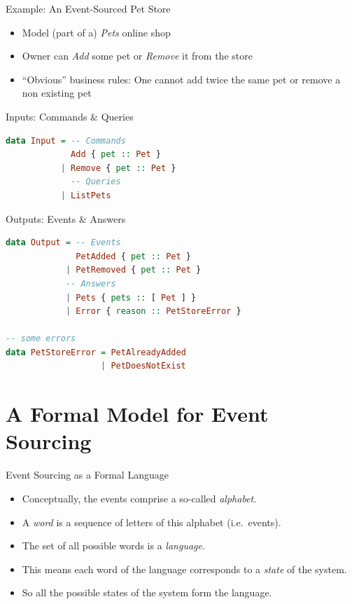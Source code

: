 \begin{frame}[fragile]{Example: An Event-Sourced Pet Store}
  \begin{itemize}[<+->]
  \item Model (part of a) \emph{Pets} online shop
  \item Owner can \emph{Add} some pet or \emph{Remove} it from the store
  \item ``Obvious'' business rules: One cannot add twice the same pet or remove a non existing pet
  \end{itemize}
\end{frame}

\begin{frame}[fragile]{Inputs: Commands \& Queries}
\begin{lstlisting}[language=Haskell,basicstyle=\ttfamily,keywordstyle=\color{red}]
data Input = -- Commands
             Add { pet :: Pet }
           | Remove { pet :: Pet }
             -- Queries
           | ListPets
\end{lstlisting}
\end{frame}

\begin{frame}[fragile]{Outputs: Events \& Answers}
\begin{lstlisting}[language=Haskell,basicstyle=\ttfamily,keywordstyle=\color{red}]
data Output = -- Events
              PetAdded { pet :: Pet }
            | PetRemoved { pet :: Pet }
            -- Answers
            | Pets { pets :: [ Pet ] }
            | Error { reason :: PetStoreError }

-- some errors
data PetStoreError = PetAlreadyAdded
                   | PetDoesNotExist
\end{lstlisting}
\end{frame}

\part{A Formal Model for Event Sourcing}

\begin{frame}[fragile]{Event Sourcing as a Formal Language}

\begin{itemize}[<+->]
\item Conceptually, the events comprise a so-called \textit{alphabet}.
\item A \textit{word} is a sequence of letters of this alphabet (i.e.~events).
\item The set of all possible words is a \textit{language}.
\item This means each word of the language corresponds to a \textit{state} of the system.
\item So all the possible states of the system form the language.
\end{itemize}

\end{frame}

